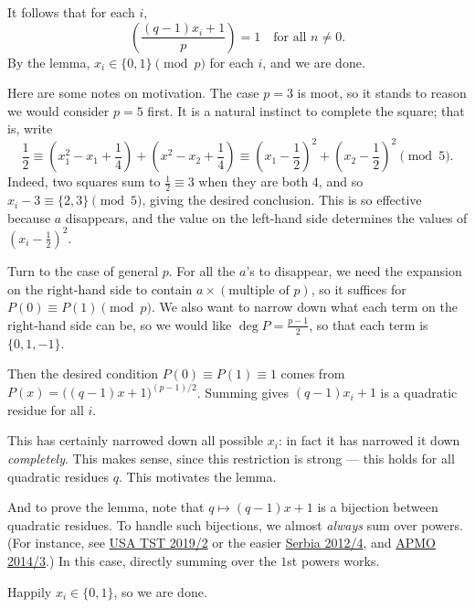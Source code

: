 It follows that for each $i$, \[\left(\frac{(q-1)x_i+1}p\right)=1\quad\text{for all }n\ne0.\]
By the lemma, $x_i\in\{0,1\}\pmod p$ for each $i$, and we are done.
\begin{remark}
    Here are some notes on motivation. The case $p=3$ is moot, so it stands to reason we would consider $p=5$ first. It is a natural instinct to complete the square; that is, write \[\frac12\equiv\left(x_1^2-x_1+\frac14\right)+\left(x^2-x_2+\frac14\right)\equiv\left(x_1-\frac12\right)^2+\left(x_2-\frac12\right)^2\pmod5.\]
    Indeed, two squares sum to $\tfrac12\equiv3$ when they are both $4$, and so $x_i-3\equiv\{2,3\}\pmod5$, giving the desired conclusion. This is so effective because $a$ disappears, and the value on the left-hand side determines the values of $(x_i-\tfrac12)^2$.

    Turn to the case of general $p$. For all the $a$'s to disappear, we need the expansion on the right-hand side to contain $a\times(\text{multiple of }p)$, so it suffices for $P(0)\equiv P(1)\pmod p$. We also want to narrow down what each term on the right-hand side can be, so we would like $\deg P=\tfrac{p-1}2$, so that each term is $\{0,1,-1\}$.

    Then the desired condition $P(0)\equiv P(1)\equiv 1$ comes from $P(x)=\big( (q-1)x+1\big)^{(p-1)/2}$. Summing gives $(q-1)x_i+1$ is a quadratic residue for all $i$.

    This has certainly narrowed down all possible $x_i$: in fact it has narrowed it down \emph{completely}. This makes sense, since this restriction is strong --- this holds for all quadratic residues $q$. This motivates the lemma.

    And to prove the lemma, note that $q\mapsto(q-1)x+1$ is a bijection between quadratic residues. To handle such bijections, we almost \emph{always} sum over powers. (For instance, see \href{https://artofproblemsolving.com/community/c6h1751589p11419598}{USA TST 2019/2} or the easier \href{https://artofproblemsolving.com/community/c6h473365p2650413}{Serbia 2012/4}, and \href{https://artofproblemsolving.com/community/c6h582821p3444911}{APMO 2014/3}.) In this case, directly summing over the $1$st powers works.

    Happily $x_i\in\{0,1\}$, so we are done.
\end{remark}

